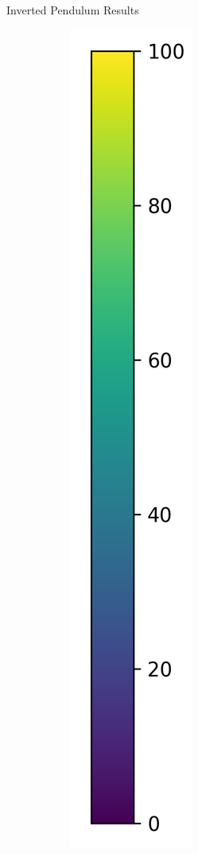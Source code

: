 \documentclass{beamer}
\begin{document}
\begin{frame}{Inverted Pendulum Results}
\begin{figure}[t]
\begin{subfigure}{0.08\linewidth}
          \includegraphics[width=\linewidth,trim=0 0 0 0,clip]{assets/viridis_lyap.png}
      \end{subfigure}
  \end{figure}
\end{frame}
\end{document}
